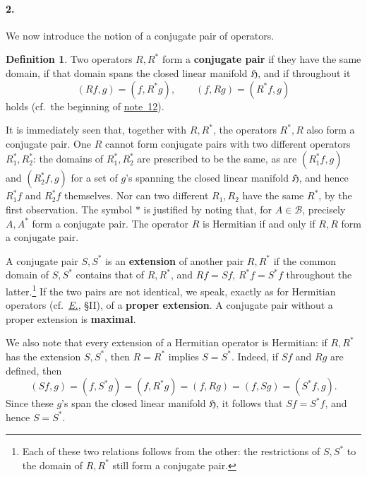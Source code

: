 \documentclass[
  paper=b5,
  twoside=true,
  fontsize=13pt,
  headings=normal,
  bookmarkpackage=false
]{scrartcl}
\theoremstyle{definition}
\newtheorem{definition}{Definition}
\newcommand{\DefinitionAnchorSeries}{1}
\newcommand{\NoteRef}[1]{\hyperref[fn:#1]{note~#1}}
\newcommand{\Eref}{\hyperref[fn:E-paper]{\emph{E.}}}
\begin{document}
\paragraph*{2.}\label{sec:iv-2}
We now introduce the notion of a conjugate pair of operators.

\renewcommand{\DefinitionAnchorSeries}{2}
\setcounter{definition}{4} %
\begin{definition}\label{def:conjugate-pair}
Two operators \(R,R^*\) form a \textbf{conjugate pair} if they have the same
domain, if that domain spans the closed linear manifold
\(\mathfrak H\), and if throughout it
\[
  (Rf,g)=(f,R^*g),\qquad
  (f,Rg)=(R^*f,g)
\]
holds (cf.\ the beginning of \NoteRef{12}).
\end{definition}

It is immediately seen that, together with \(R,R^*\), the operators
\(R^*,R\) also form a conjugate pair.  One \(R\) cannot form conjugate
pairs with two different operators \(R_1^*,R_2^*\): the domains of
\(R_1^*,R_2^*\) are prescribed to be the same, as are
\((R_1^*f,g)\) and \((R_2^*f,g)\) for a set of \(g\)'s spanning the
closed linear manifold \(\mathfrak H\), and hence \(R_1^*f\) and
\(R_2^*f\) themselves.  Nor can two different \(R_1,R_2\) have the same
\(R^*\), by the first observation.  The symbol \(\ast\) is justified by
noting that, for \(A\in\mathcal B\), precisely \(A,A^*\) form a
conjugate pair.  The operator \(R\) is Hermitian if and only if \(R,R\)
form a conjugate pair.

A conjugate pair \(S,S^*\) is an \textbf{extension} of another pair
\(R,R^*\) if the common domain of \(S,S^*\) contains that of \(R,R^*\),
and \(Rf=Sf\), \(R^*f=S^*f\) throughout the latter.\footnote{\label{fn:60}
Each of these two relations follows from the other: the restrictions
of \(S,S^*\) to the domain of \(R,R^*\) still form a conjugate pair.}
If the two pairs are not identical, we speak, exactly as for Hermitian
operators (cf.\ \Eref, \S II), of a \textbf{proper extension}.  A
conjugate pair without a proper extension is \textbf{maximal}.

We also note that every extension of a Hermitian operator is Hermitian:
if \(R,R^*\) has the extension \(S,S^*\), then \(R=R^*\) implies \(S=S^*\). Indeed, if \(Sf\) and \(Rg\) are defined, then
\[
  (Sf,g)=(f,S^*g)=(f,R^*g)=(f,Rg)
  =(f,Sg)=(S^*f,g).
\]
Since these \(g\)'s span the closed linear manifold \(\mathfrak H\), it
follows that \(Sf=S^*f\), and hence \(S=S^*\).
\end{document}
